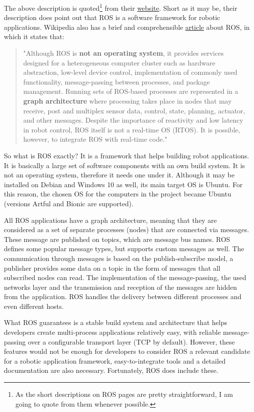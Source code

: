 The above description is quoted\footnote{As the short descriptions on ROS pages are pretty straightforward, I am going to quote from them whenever possible.} from their \href{https://www.ros.org/}{website}. Short as it may be, their description does point out that ROS is a software framework for robotic applications. Wikipedia also has a brief and comprehensible \href{https://en.wikipedia.org/wiki/Robot_Operating_System}{article} about ROS, in which it states that:

\begin{quote}
"Although ROS is \textbf{not an operating system}, it provides services designed for a heterogeneous computer cluster such as hardware abstraction, low-level device control, implementation of commonly used functionality, message-passing between processes, and package management. Running sets of ROS-based processes are represented in a \textbf{graph architecture} where processing takes place in nodes that may receive, post and multiplex sensor data, control, state, planning, actuator, and other messages. Despite the importance of reactivity and low latency in robot control, ROS itself is not a real-time OS (RTOS). It is possible, however, to integrate ROS with real-time code."
\end{quote}

So what is ROS exactly? It is a framework that helps building robot applications. It is basically a large set of software components with an own build system. It is not an operating system, therefore it needs one under it. Although it may be installed on Debian and Windows 10 as well, its main target OS is Ubuntu. For this reason, the chosen OS for the computers in the project became Ubuntu (versions Artful and Bionic are supported).

All ROS applications have a graph architecture, meaning that they are considered as a set of separate processes (nodes) that are connected via messages. These message are published on topics, which are message bus names. ROS defines some popular message types, but supports custom messages as well. The communication through messages is based on the publish-subscribe model, a publisher provides some data on a topic in the form of messages that all subscribed nodes can read. The implementation of the message-passing, the used networks layer and the transmission and reception of the messages are hidden from the application. ROS handles the delivery between different processes and even different hosts.

What ROS guarantees is a stable build system and architecture that helps developers create multi-process applications relatively easy, with reliable message-passing over a configurable transport layer (TCP by default). However, these features would not be enough for developers to consider ROS a relevant candidate for a robotic application framework, easy-to-integrate tools and a detailed documentation are also necessary. Fortunately, ROS does include these.

